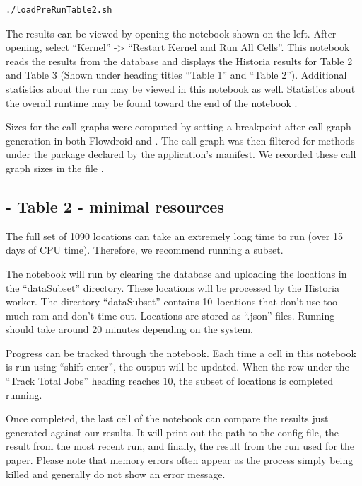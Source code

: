 \documentclass{acmart} %
\begin{document}
\begin{lstlisting}[language=bash]
    ./loadPreRunTable2.sh
\end{lstlisting}

The results can be viewed by opening the notebook  shown on the left.  After opening, select ``Kernel'' -> ``Restart Kernel and Run All Cells''.
This notebook reads the results from the database and displays the Historia results for Table 2 and Table 3 (Shown under heading titles ``Table 1'' and ``Table 2''). Additional statistics about the run may be viewed in this notebook as well. Statistics about the overall runtime may be found toward the end of the notebook .

Sizes for the call graphs were computed by setting a breakpoint after call graph generation in both Flowdroid and \toolname.  The call graph was then filtered for methods under the package declared by the application's manifest.  We recorded these call graph sizes in the file .

\subsection{ - Table 2 - minimal resources}

\newcommand{\numsubset}{10}
The full set of 1090 locations can take an extremely long time to run (over 15 days of CPU time).  Therefore, we recommend running a subset.


The notebook  will run by clearing the database and uploading the locations in the ``dataSubset'' directory.  These locations will be processed by the Historia worker.  
The directory ``dataSubset'' contains \numsubset~locations that don't use too much ram and don't time out.  Locations are stored as ``.json'' files.
Running should take around 20 minutes depending on the system.

Progress can be tracked through the  notebook.  
Each time a cell in this notebook is run using ``shift-enter'', the output will be updated.
When the  row under the ``Track Total Jobs'' heading reaches \numsubset, the subset of locations is completed running.

Once completed, the last cell of the notebook  can compare the results just generated against our results.  It will print out the path to the config file, the result from the most recent run, and finally, the result from the run used for the paper.  Please note that memory errors often appear as the process simply being killed and generally do not show an error message.
\end{document}
